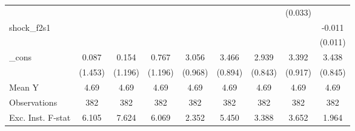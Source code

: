 {\begin{tabular}{l*{8}{c}}
            &                     &                     &                     &                     &                     &                     &     (0.033)         &                     \\
\addlinespace
shock\_f2s1  &                     &                     &                     &                     &                     &                     &                     &      -0.011         \\
            &                     &                     &                     &                     &                     &                     &                     &     (0.011)         \\
\addlinespace
\_cons      &       0.087         &       0.154         &       0.767         &       3.056\sym{***}&       3.466\sym{***}&       2.939\sym{***}&       3.392\sym{***}&       3.438\sym{***}\\
            &     (1.453)         &     (1.196)         &     (1.196)         &     (0.968)         &     (0.894)         &     (0.843)         &     (0.917)         &     (0.845)         \\
\midrule
Mean Y      &        4.69         &        4.69         &        4.69         &        4.69         &        4.69         &        4.69         &        4.69         &        4.69         \\
Observations&         382         &         382         &         382         &         382         &         382         &         382         &         382         &         382         \\
Exc. Inst. F-stat&       6.105         &       7.624         &       6.069         &       2.352         &       5.450         &       3.388         &       3.652         &       1.964         \\
\bottomrule
\end{tabular}
}
